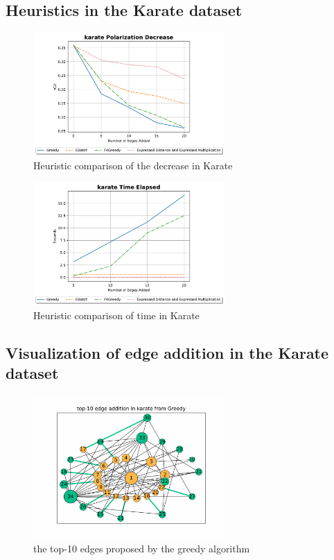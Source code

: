 \subsection{Heuristics in the Karate dataset}


\begin{figure}[!htbp]
	\centering
	\includegraphics[width=0.65\textwidth]{Figures/Karate Polarization Decrease}
	\caption{Heuristic comparison of the decrease in Karate}
	\label{fig:karate_pol}
\end{figure}

\clearpage


\begin{figure}[!htbp]
	\centering
	\includegraphics[width=0.65\textwidth]{Figures/Karate Time Elapsed}
	\caption{Heuristic comparison of time in Karate}
	\label{fig:karate_time}
\end{figure}


\subsection{Visualization of edge addition in  the Karate dataset}

\begin{figure}[!htbp]
	\centering
	\includegraphics[width=0.65\textwidth]{Figures/top-10_karate_greedy}
	\caption{the top-10 edges proposed by the greedy algorithm}
	\label{fig:top-10-karate}
\end{figure}


